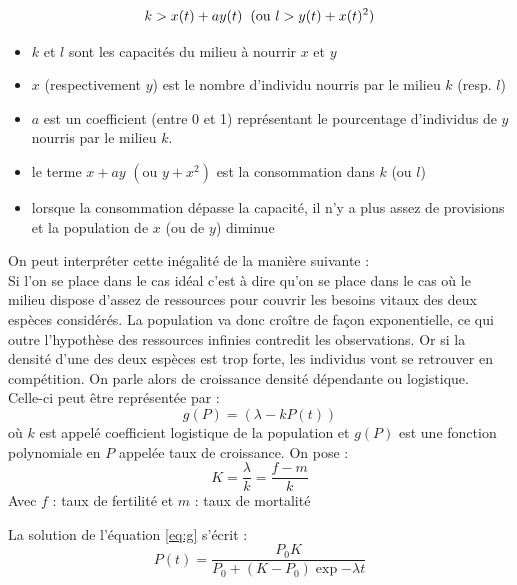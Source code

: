 \documentclass{article}
\begin{document}
\begin{equation*}
    k > x(t) + a y(t) \hspace{0.2cm} \text{(ou } l> y(t) + x(t)^{2}) 
\end{equation*}
\begin{itemize}
    \item $k$ et $l$ sont les capacités du milieu à nourrir $x$ et $y$
    \item $x$ (respectivement $y$) est le nombre d'individu nourris par le milieu $k$ (resp. $l$)
    \item $a$ est un coefficient (entre 0 et 1) représentant le pourcentage d'individus de $y$ nourris par le milieu $k$.
    \item le terme $x + a y$ $(\text{ou } y+ x^{2})$ est la consommation dans $k$ (ou $l$)
    \item lorsque la consommation dépasse la capacité, il n'y a plus assez de provisions et la population de $x$ (ou de $y$) diminue
\end{itemize}
On peut interpréter cette inégalité de la manière suivante :\\
Si l'on se place dans le cas idéal c'est à dire qu'on se place dans le cas où le milieu dispose d'assez de ressources pour couvrir les besoins vitaux des deux espèces considérés. La population va donc croître de façon exponentielle, ce qui outre l'hypothèse des ressources infinies contredit les observations. Or si la densité d'une des deux espèces est trop forte, les individus vont se retrouver en compétition. On parle alors de croissance densité dépendante ou logistique.\\

Celle-ci peut être représentée par :
\begin{equation}
\label{eq:g}
\tag{G}
    g(P) = (\lambda-kP(t))
\end{equation}
où $k$ est appelé coefficient logistique de la population et $g(P)$ est une fonction polynomiale en $P$ appelée taux de croissance.
On pose : 
\begin{equation*}
    K = \frac{\lambda}{k}= \frac{f-m}{k}
\end{equation*}
Avec $f$ : taux de fertilité et $m$ : taux de mortalité

La solution de l'équation \eqref{eq:g} s'écrit :
\begin{equation*}
    P(t) = \frac{P_{0}K}{P_{0}+(K-P_{0})\exp{-\lambda}t}
\end{equation*}\\
\end{document}
